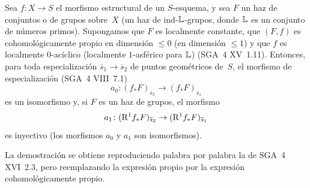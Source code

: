 
\begin{proposition}
\label{XIII.1.14}
Sea $f\colon X \to S$ el morfismo estructural de un $S$-esquema, y sea
$F$ un haz de conjuntos o de grupos sobre~$X$ (\resp un haz de
ind-$\mathbb L$-grupos, donde $\mathbb L$ es un conjunto de números primos).
Supongamos que $F$ es localmente constante, que $(F,f)$ es
cohomológicamente propio en dimensión $\leqslant 0$ (\resp en dimensión
$\leqslant 1$) y que $f$ es localmente $0$-acíclico (\resp localmente
$1$-asférico para $\mathbb L$) \textup{(SGA~4 XV~1.11)}. Entonces, para toda
especialización $\overline{s}_1 \to \overline{s}_2$ de puntos geométricos
de~$S$, el morfismo de especialización \textup{(SGA~4 VIII~7.1)}
$$
a_0 \colon (f_* F)_{\overline{s}_2} \to (f_*
F)_{\overline{s}_1}
$$
es un isomorfismo y, si $F$ es un haz de grupos, el morfismo
$$
a_1 \colon (\mathrm{R}^1 f_* F)_{\overline{s}_2} \to (\mathrm{R}^1 f_*
F)_{\overline{s}_1}
$$
es inyectivo (\resp los morfismos $a_0$ y $a_1$ son isomorfismos).
\end{proposition}

La
demostración se obtiene reproduciendo palabra por palabra la de SGA~4
XVI~2.3, pero reemplazando la expresión \og propio\fg{} por la expresión
\og cohomológicamente propio\fg.

{}
{\enlargethispage{.5cm}}
